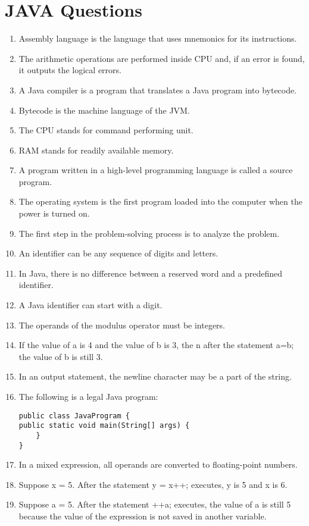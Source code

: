 \documentclass[12pt,a4paper,final,twoside,onecolumn,titlepage]{book}
\begin{document}
\section{JAVA Questions}
\label{JavaQuestionsTrueFalse}
\begin{enumerate}
\item Assembly language is the language that uses mnemonics for its instructions.
\item The arithmetic operations are performed inside CPU and, if an error is found, it outputs the logical errors.
\item A Java compiler is a program that translates a Java program into bytecode.
\item Bytecode is the machine language of the JVM.
\item The CPU stands for command performing unit.
\item RAM stands for readily available memory.
\item A program written in a high-level programming language is called a source program.
\item The operating system is the first program loaded into the computer when the power is turned on.
\item The first step in the problem-solving process is to analyze the problem.
\item An identifier can be any sequence of digits and letters.
\item In Java, there is no difference between a reserved word and a predefined identifier.
\item A Java identifier can start with a digit.
\item The operands of the modulus operator must be integers.
\item If the value of a is 4 and the value of b is 3, the n after the statement a=b; the value of b is still 3.
\item In an output statement, the newline character may be a part of the string.
\item The following is a legal Java program:
\begin{lstlisting}
public class JavaProgram {
public static void main(String[] args) {
	}
}
\end{lstlisting}
\item In a mixed expression, all operands are converted to floating-point numbers.
\item Suppose x = 5. After the statement y = x++; executes, y is 5 and x is 6.
\item Suppose a = 5. After the statement ++a; executes, the value of a is still 5 because the value of the expression is not saved in another variable.

\end{enumerate}
\end{document}

